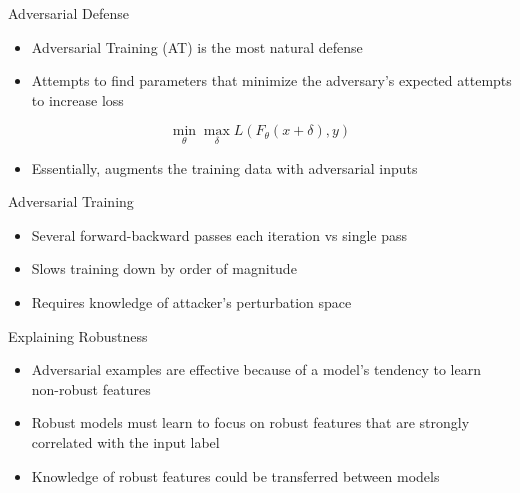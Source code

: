 \documentclass{beamer}
\begin{document}
\begin{frame}{Adversarial Defense}
	
	\begin{itemize}
		\item Adversarial Training (AT) \cite{madry2017towards} is the most natural defense 
		\item Attempts to find parameters that minimize the adversary's expected attempts to increase loss
	\end{itemize}

	$$\min_{\theta} \max_{\delta} L(F_\theta(x+\delta), y)$$
	

	\begin{itemize}
		\item Essentially, augments the training data with adversarial inputs
	\end{itemize}
	
\end{frame}


\begin{frame}{Adversarial Training}
	
	\begin{itemize}
		\item Several forward-backward passes each iteration vs single pass
		\item Slows training down by order of magnitude
		\item Requires knowledge of attacker's perturbation space
	\end{itemize}
	
\end{frame}


\begin{frame}{Explaining Robustness}
	
	\begin{itemize}
		\item Adversarial examples are effective because of a model's tendency to learn non-robust features \cite{ilyas2019adversarial}
		\item Robust models must learn to focus on robust features that are strongly correlated with the input label
		\item Knowledge of robust features could be transferred between models
	\end{itemize}
	
\end{frame}
\end{document}

